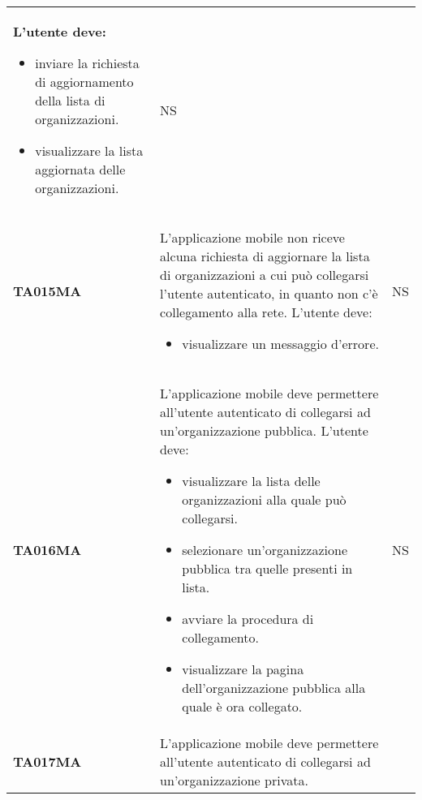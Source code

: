 \documentclass[../piano-di-qualifica.tex]{subfiles}
\begin{document}
\begin{longtable}[H]{>{\centering\bfseries}m{3cm} >{}m{10cm} >{\centering\arraybackslash}m{3cm}}
  L'utente deve:
  \begin{itemize}
    \item inviare la richiesta di aggiornamento della lista di organizzazioni.
    \item visualizzare la lista aggiornata delle organizzazioni.
  \end{itemize}
                    & NS                                                                                                                                                                                                                                                               \\
  TA015MA           & L'applicazione mobile non riceve alcuna richiesta di aggiornare la lista di organizzazioni a cui può collegarsi l'utente autenticato, in quanto non c'è collegamento alla rete. \newline
  L'utente deve:
  \begin{itemize}
    \item visualizzare un messaggio d'errore.
  \end{itemize}
                    & NS                                                                                                                                                                                                                                                               \\
  TA016MA           & L'applicazione mobile deve permettere all'utente autenticato di collegarsi ad un'organizzazione pubblica. \newline
  L'utente deve:
  \begin{itemize}
    \item visualizzare la lista delle organizzazioni alla quale può collegarsi.
    \item selezionare un'organizzazione pubblica tra quelle presenti in lista.
    \item avviare la procedura di collegamento.
    \item visualizzare la pagina dell'organizzazione pubblica alla quale è ora collegato.
  \end{itemize}
                    & NS                                                                                                                                                                                                                                                               \\
  TA017MA           & L'applicazione mobile deve permettere all'utente autenticato di collegarsi ad un'organizzazione privata. \newline

\end{longtable}
\end{document}
